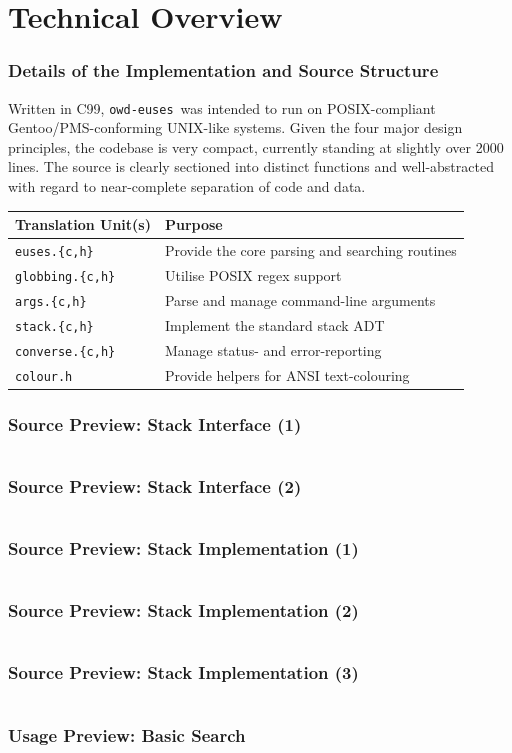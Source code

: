 \documentclass{beamer}
\numberwithin{figure}{section}
\newcommand\chext{.{\fontfamily{cmr}\{}c,h{\fontfamily{cmr}\}}}
\newcounter{firstsrcline}
\newcounter{lastsrcline}
\newcommand\srclinelimit{29}
\newcommand\resetsrclines{%
    \setcounter{firstsrcline}{1}
    \setcounter{lastsrcline}{\thefirstsrcline+\srclinelimit}
}
\newcommand\continuesource[1]{%
    \inputminted[firstline=\thefirstsrcline, lastline=\thelastsrcline,
        firstnumber=\thefirstsrcline]{c}{listings/#1}
    \setcounter{firstsrcline}{\thelastsrcline+1}
    \setcounter{lastsrcline}{\thefirstsrcline+\srclinelimit}
}
\newcommand\programname{\texttt{owd-euses}}
\begin{document}
\section{Technical Overview}
\begin{frame}
    \frametitle{Details of the Implementation and Source Structure}
    Written in C99, \programname\ was intended to run on POSIX-compliant
    Gentoo/PMS-conforming UNIX-like systems. Given the four major design
    principles, the codebase is very compact, currently standing at slightly
    over 2000 lines. The source is clearly sectioned into distinct functions and
    well-abstracted with regard to near-complete separation of code and data.
    \pause

    \begin{center}
        \begin{tabular}{ll}
            \hline
            \textbf{Translation Unit(s)} & \textbf{Purpose} \\
            \hline
            \texttt{euses\chext} & Provide the core parsing and searching
                routines \\
            \texttt{globbing\chext} & Utilise POSIX regex support \\
            \texttt{args\chext} & Parse and manage command-line arguments \\
            \texttt{stack\chext} & Implement the standard stack ADT \\
            \texttt{converse\chext} & Manage status- and error-reporting \\
            \texttt{colour.h} & Provide helpers for ANSI text-colouring \\
            \hline
        \end{tabular}
    \end{center}
\end{frame}
\begin{frame}
    \frametitle{Source Preview: Stack Interface (1)}
    \resetsrclines
    \continuesource{stack.h}
\end{frame}
\begin{frame}
    \frametitle{Source Preview: Stack Interface (2)}
    \continuesource{stack.h}
\end{frame}
\begin{frame}
    \frametitle{Source Preview: Stack Implementation (1)}
    \resetsrclines
    \continuesource{stack.c}
\end{frame}
\begin{frame}
    \frametitle{Source Preview: Stack Implementation (2)}
    \continuesource{stack.c}
\end{frame}
\begin{frame}
    \frametitle{Source Preview: Stack Implementation (3)}
    \continuesource{stack.c}
\end{frame}
\begin{frame}
    \frametitle{Usage Preview: Basic Search}
\end{frame}
\end{document}
